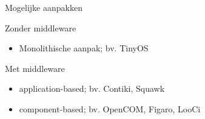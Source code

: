 \documentclass[presentation, bigger]{beamer}
\begin{document}
\begin{frame}[label=sec-2-2]{Mogelijke aanpakken}

\begin{minipage}{.5\textwidth}
{\large Zonder middleware}
\begin{itemize}
\item Monolithische aanpak; bv. TinyOS
\end{itemize}
{\large Met middleware}
\begin{itemize}
  \item application-based; bv. Contiki, Squawk
  \item component-based; bv. OpenCOM, Figaro, LooCi
  \end{itemize}
      
    \end{minipage}%
\begin{minipage}{.5\textwidth}
      \centering
      
    \end{minipage}




\end{frame}
\end{document}
